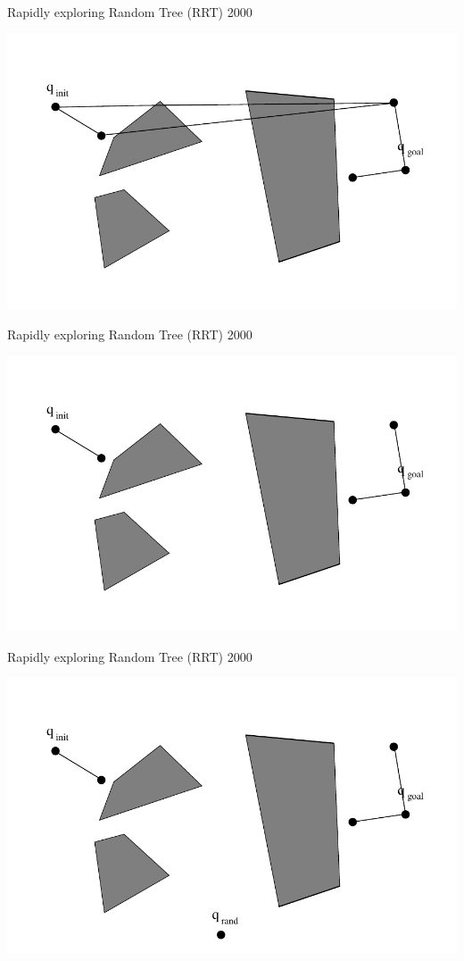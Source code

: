 \begin{frame} {Rapidly exploring Random Tree (RRT) 2000}
\centerline {
  \includegraphics[width=.8\linewidth]{figures/RRT09.pdf}
}
\end{frame}

\begin{frame} {Rapidly exploring Random Tree (RRT) 2000}
\centerline {
  \includegraphics[width=.8\linewidth]{figures/RRT10.pdf}
}
\end{frame}

\begin{frame} {Rapidly exploring Random Tree (RRT) 2000}
\centerline {
  \includegraphics[width=.8\linewidth]{figures/RRT11.pdf}
}
\end{frame}

